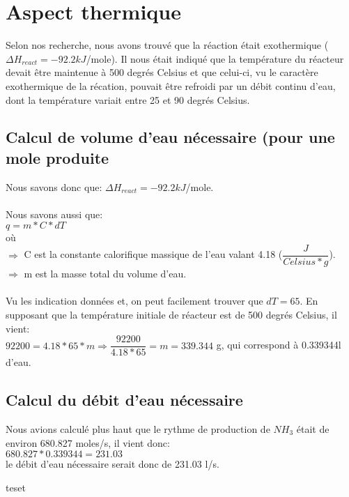 \documentclass[11pt,a4paper]{report}
\begin{document}
\section{Aspect thermique}
Selon nos recherche, nous avons trouvé que la réaction était exothermique ($\Delta H_{react} = -92.2kJ$/mole). Il nous était indiqué que la température du réacteur devait être maintenue à 500 degrés Celsius et que celui-ci, vu le caractère exothermique de la récation, pouvait être refroidi par un débit continu d'eau, dont la température variait entre 25 et 90 degrés Celsius.

\subsection{Calcul de volume d'eau nécessaire (pour une mole produite}
Nous savons donc que: $\Delta H_{react} = -92.2kJ$/mole. \\ \\
Nous savons aussi que:\\
 $q = m*C*dT$ \\
 où\\
 $\Rightarrow$ C est la constante calorifique massique de l'eau valant 4.18 ($\dfrac{J}{Celsius *g}$). \\
$\Rightarrow$  m est la masse total du volume d'eau.\\
\\
 Vu les indication données et, on peut facilement trouver que $dT=65$. En supposant que la température initiale de réacteur est de 500 degrés Celsius, il vient: \\
$92200 = 4.18*65*m \Rightarrow \dfrac{92200}{4.18*65} = m = 339.344$ g, qui correspond à 0.339344l d'eau.

\subsection{Calcul du débit d'eau nécessaire}
Nous avions calculé plus haut que le rythme de production de $NH_3$ était de environ 680.827 moles/s, il vient donc: \\
$680.827*0.339344 = 231.03$ \\
le débit d'eau nécessaire serait donc de 231.03 l/s.

teset
\end{document}
